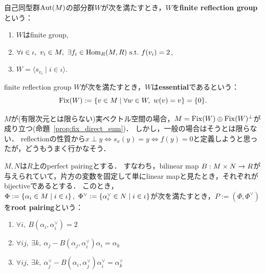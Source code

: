 \begin{definition}
  \label{defi:FiniteReflectionGroup}
  \leanok
  自己同型群$\operatorname{Aut}(M)$の部分群$W$が次を満たすとき，$W$を\textbf{finite reflection group}という：
  \begin{enumerate}[label=(\roman*)]
    \item $W$はfinite group,
    \item $\forall i \in \iota,\ v_i \in M,\ \exists f_i \in \Hom_R(M, R) \st f(v_i) = 2$,
    \item $W = \langle s_{v_i} \mid i \in \iota \rangle$.
  \end{enumerate}
\end{definition}

\begin{definition}
  \label{defi:essFRG}
  \leanok
  finite reflection group $W$が次を満たすとき，$W$は\textbf{essential}であるという：
  \begin{equation}
    \Fix(W) := \set{v \in M}{\forall w \in W,\ w(v) = v} = \{0\}.
  \end{equation}
\end{definition}

\begin{remark}
  $M$が(有限次元とは限らない)実ベクトル空間の場合，$M = \operatorname{Fix}(W) \oplus \operatorname{Fix}(W)^\perp$が成り立つ(命題~\ref{prop:fix_direct_sum})．
  しかし，一般の場合はそうとは限らない．
  reflectionの性質から$x \perp y \iff s_x(y) = y \iff f(y) = 0$と定義しようと思ったが，どうもうまく行かなそう．
\end{remark}

\begin{definition}
  \label{defi:RootPairing}
  \leanok
  $M, N$は$R$上のperfect pairingとする．
  すなわち，bilinear map $B : M \times N \rightarrow R$が与えられていて，片方の変数を固定して単にlinear mapと見たとき，それぞれがbijectiveであるとする．
  このとき，$\Phi := \set{\alpha_i \in M}{i \in \iota},\ \Phi^\vee := \set{\alpha^\vee_i \in N}{i \in \iota}$が次を満たすとき，$P := (\Phi, \Phi^\vee)$を\textbf{root pairing}という：
  \begin{enumerate}[label=(\roman*)]
    \item $\forall i,\ B(\alpha_i, \alpha^\vee_i) = 2$ \label{defi:RootPairing_EqTwo}
    \item $\forall i j,\ \exists k,\ \alpha_j - B(\alpha_j, \alpha^\vee_i) \alpha_i = \alpha_k$
    \item $\forall i j,\ \exists k,\ \alpha^\vee_j - B(\alpha_i, \alpha^\vee_j) \alpha^\vee_i = \alpha^\vee_k$
  \end{enumerate}
\end{definition}

